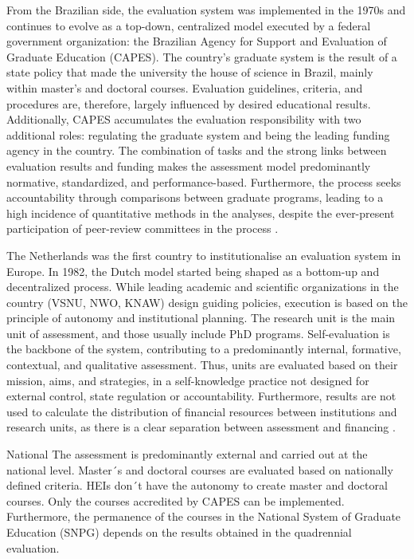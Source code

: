 From the Brazilian side, the evaluation system was implemented in the 1970s and continues to evolve as a top-down, centralized model executed by a federal government organization: the Brazilian Agency for Support and Evaluation of Graduate Education (CAPES). The country’s graduate system is the result of a state policy that made the university the house of science in Brazil, mainly within master’s and doctoral courses. Evaluation guidelines, criteria, and procedures are, therefore, largely influenced by desired educational results. Additionally, CAPES accumulates the evaluation responsibility with two additional roles: regulating the graduate system and being the leading funding agency in the country. The combination of tasks and the strong links between evaluation results and funding makes the assessment model predominantly normative, standardized, and performance-based. Furthermore, the process seeks accountability through comparisons between graduate programs, leading to a high incidence of quantitative methods in the analyses, despite the ever-present participation of peer-review committees in the process \autocite{Brasil.2020, 977/1965, Verhine.2008}.

The Netherlands was the first country to institutionalise an evaluation system in Europe. In 1982, the Dutch model started being shaped as a bottom-up and decentralized process. While leading academic and scientific organizations in the country (VSNU, NWO, KNAW) design guiding policies, execution is based on the principle of autonomy and institutional planning. The research unit is the main unit of assessment, and those usually include PhD programs. Self-evaluation is the backbone of the system, contributing to a predominantly internal, formative, contextual, and qualitative assessment. Thus, units are evaluated based on their mission, aims, and strategies, in a self-knowledge practice not designed for external control, state regulation or accountability. Furthermore, results are not used to calculate the distribution of financial resources between institutions and research units, as there is a clear separation between assessment and financing \autocite{Drooge.2013, VSNU.2020}.


National  
The assessment is predominantly external and carried out at the national level. Master´s and doctoral courses are evaluated based on nationally defined criteria. HEIs don´t have the autonomy to create master and doctoral courses. Only the courses accredited by CAPES can be implemented. Furthermore, the permanence of the courses in the National System of Graduate Education (SNPG) depends on the results obtained in the quadrennial evaluation. 

